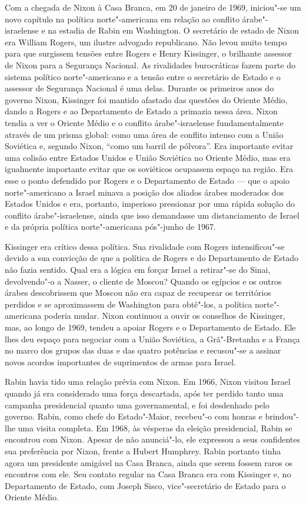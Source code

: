 Com a chegada de Nixon à Casa Branca, em 20 de janeiro de 1969, iniciou"-se
um novo capítulo na política norte"-americana em relação ao conflito
árabe"-israelense e na estadia de Rabin em Washington. O secretário de
estado de Nixon era William Rogers, um ilustre advogado republicano. Não
levou muito tempo para que surgissem tensões entre Rogers e Henry
Kissinger, o brilhante assessor de Nixon para a Segurança Nacional. As
rivalidades burocráticas fazem parte do sistema político norte"-americano
e a tensão entre o secretário de Estado e o assessor de Segurança
Nacional é uma delas. Durante os primeiros anos do governo Nixon,
Kissinger foi mantido afastado das questões do Oriente Médio, dando a
Rogers e ao Departamento de Estado a primazia nessa área. Nixon tendia a
ver o Oriente Médio e o conflito árabe"-israelense fundamentalmente
através de um prisma global: como uma área de conflito intenso com a
União Soviética e, segundo Nixon, ``como um barril de pólvora''. Era
importante evitar uma colisão entre Estados Unidos e União Soviética no
Oriente Médio, mas era igualmente importante evitar que os soviéticos
ocupassem espaço na região. Era esse o ponto defendido por
Rogers e o Departamento de Estado --- que o apoio norte"-americano a
Israel minava a posição dos aliados árabes moderados dos Estados Unidos
e era, portanto, imperioso pressionar por uma rápida solução do conflito
árabe"-israelense, ainda que isso demandasse um distanciamento de Israel e
da própria política norte"-americana pós"-junho de 1967.

Kissinger era crítico dessa política. Sua rivalidade com Rogers
intensificou"-se devido a sua convicção de que a política de Rogers e do
Departamento de Estado não fazia sentido. Qual era a lógica em forçar
Israel a retirar"-se do Sinai, devolvendo"-o a Nasser, o cliente de
Moscou? Quando os egípcios e os outros árabes descobrissem que Moscou
não era capaz de recuperar os territórios perdidos e se aproximassem de
Washington para obtê"-los, a política norte"-americana poderia mudar.
Nixon continuou a ouvir os conselhos de Kissinger, mas, ao longo de 1969,
tendeu a apoiar Rogers e o Departamento de Estado. Ele lhes deu espaço
para negociar com a União Soviética, a Grã"-Bretanha e a França no marco
dos grupos das duas e das quatro potências e recusou"-se a assinar novos
acordos importantes de suprimentos de armas para Israel.

Rabin havia tido uma relação prévia com Nixon. Em 1966, Nixon visitou
Israel quando já era considerado uma força descartada, após ter perdido
tanto uma campanha presidencial quanto uma governamental, e foi
desdenhado pelo governo. Rabin, como chefe do Estado"-Maior, recebeu"-o com
honras e brindou"-lhe uma visita completa. Em 1968, às vésperas da
eleição presidencial, Rabin se encontrou com Nixon. Apesar de não
anunciá"-lo, ele expressou a seus confidentes sua preferência por
Nixon, frente a Hubert Humphrey. Rabin portanto tinha agora um
presidente amigável na Casa Branca, ainda que serem fossem raros os
encontros com ele. Seu contato regular na Casa Branca era com Kissinger
e, no Departamento de Estado, com Joseph Sisco, vice"-secretário de
Estado para o Oriente Médio.

